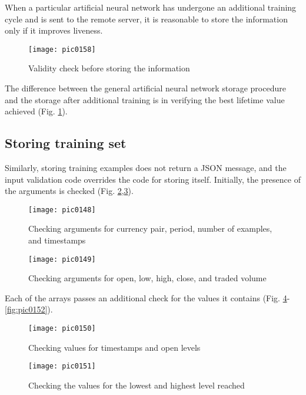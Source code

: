 When a particular artificial neural network has undergone an additional training cycle and is sent to the remote server, it is reasonable to store the information only if it improves liveness.

\begin{figure}[h]
\centering
\texttt{[image: pic0158]}
\caption{Validity check before storing the information}
\label{fig:pic0158}
\end{figure}
\FloatBarrier

The difference between the general artificial neural network storage procedure and the storage after additional training is in verifying the best lifetime value achieved (Fig. \ref{fig:pic0158}).

\subsection{Storing training set}

Similarly, storing training examples does not return a JSON message, and the input validation code overrides the code for storing itself. Initially, the presence of the arguments is checked (Fig. \ref{fig:pic0148},\ref{fig:pic0149}).

\begin{figure}[h]
\centering
\texttt{[image: pic0148]}
\caption{Checking arguments for currency pair, period, number of examples, and timestamps}
\label{fig:pic0148}
\end{figure}
\FloatBarrier

\begin{figure}[h]
\centering
\texttt{[image: pic0149]}
\caption{Checking arguments for open, low, high, close, and traded volume}
\label{fig:pic0149}
\end{figure}
\FloatBarrier

Each of the arrays passes an additional check for the values it contains (Fig. \ref{fig:pic0150}-\ref{fig:pic0152}).

\begin{figure}[h]
\centering
\texttt{[image: pic0150]}
\caption{Checking values for timestamps and open levels}
\label{fig:pic0150}
\end{figure}
\FloatBarrier

\begin{figure}[h]
\centering
\texttt{[image: pic0151]}
\caption{Checking the values for the lowest and highest level reached}
\label{fig:pic0151}
\end{figure}
\FloatBarrier

